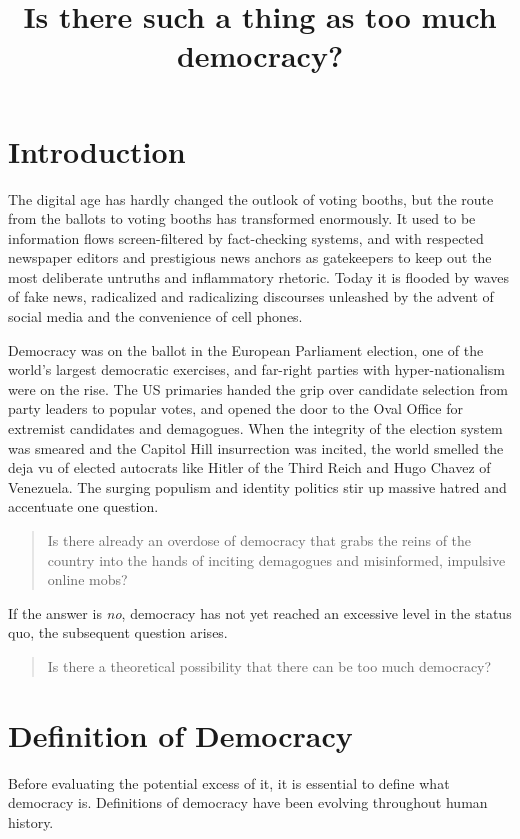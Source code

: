 \documentclass{scrartcl}
\theoremstyle{definition}
\begin{document}
\title{Is there such a thing as too much democracy?}
\author{}
\date{}
\maketitle

\section{Introduction}

The digital age has hardly changed the outlook of voting booths, but
the route from the ballots to voting booths has transformed enormously.
It used to be information flows screen-filtered by fact-checking systems,
and with respected newspaper editors and prestigious news anchors
as gatekeepers to keep out the most deliberate untruths and inflammatory
rhetoric. Today it is flooded by waves of fake news, radicalized and
radicalizing discourses unleashed by the advent of social media and
the convenience of cell phones. 

Democracy was on the ballot in the European Parliament election, one
of the world’s largest democratic exercises, and far-right parties
with hyper-nationalism were on the rise. The US primaries handed the
grip over candidate selection from party leaders to popular votes,
and opened the door to the Oval Office for extremist candidates and
demagogues. When the integrity of the election system was smeared
and the Capitol Hill insurrection was incited, the world smelled the
deja vu of elected autocrats like Hitler of the Third Reich and Hugo
Chavez of Venezuela. The surging populism and identity politics stir
up massive hatred and accentuate one question. 
\begin{quote}
Is there already an overdose of democracy that grabs the reins of
the country into the hands of inciting demagogues and misinformed,
impulsive online mobs? 
\end{quote}
If the answer is \emph{no}, democracy has not yet reached an excessive level
in the status quo, the subsequent question arises.
\begin{quote}
Is there a theoretical possibility that there can be too much democracy? 
\end{quote}

\section{Definition of Democracy}

Before evaluating the potential excess of it, it is essential to define
what democracy is. Definitions of democracy have been evolving throughout
human history. 
\end{document}
